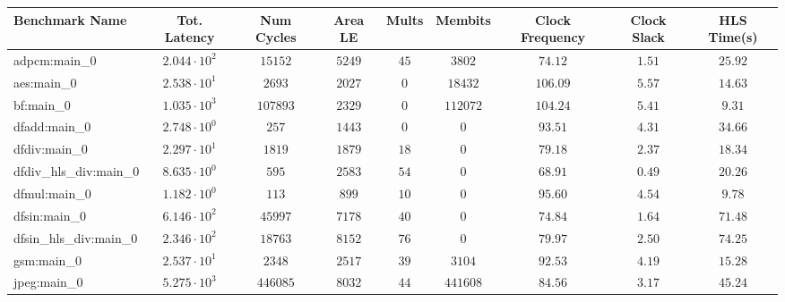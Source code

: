 \begin{tabular}{|l|c|c|c|c|c|c|c|c|}
\hline
Benchmark Name          & Tot. Latency           & Num Cycles & Area LE   & Mults   & Membits    & Clock Frequency & Clock Slack & HLS Time(s) \\
\hline
adpcm:main\_0           & $ 2.044 \cdot 10^{2} $ & $ 15152  $ & $ 5249  $ & $ 45  $ & $ 3802   $ & $ 74.12       $ & $ 1.51    $ & $ 25.92   $ \\
aes:main\_0             & $ 2.538 \cdot 10^{1} $ & $ 2693   $ & $ 2027  $ & $ 0   $ & $ 18432  $ & $ 106.09      $ & $ 5.57    $ & $ 14.63   $ \\
bf:main\_0              & $ 1.035 \cdot 10^{3} $ & $ 107893 $ & $ 2329  $ & $ 0   $ & $ 112072 $ & $ 104.24      $ & $ 5.41    $ & $ 9.31    $ \\
dfadd:main\_0           & $ 2.748 \cdot 10^{0} $ & $ 257    $ & $ 1443  $ & $ 0   $ & $ 0      $ & $ 93.51       $ & $ 4.31    $ & $ 34.66   $ \\
dfdiv:main\_0           & $ 2.297 \cdot 10^{1} $ & $ 1819   $ & $ 1879  $ & $ 18  $ & $ 0      $ & $ 79.18       $ & $ 2.37    $ & $ 18.34   $ \\
dfdiv\_hls\_div:main\_0 & $ 8.635 \cdot 10^{0} $ & $ 595    $ & $ 2583  $ & $ 54  $ & $ 0      $ & $ 68.91       $ & $ 0.49    $ & $ 20.26   $ \\
dfmul:main\_0           & $ 1.182 \cdot 10^{0} $ & $ 113    $ & $ 899   $ & $ 10  $ & $ 0      $ & $ 95.60       $ & $ 4.54    $ & $ 9.78    $ \\
dfsin:main\_0           & $ 6.146 \cdot 10^{2} $ & $ 45997  $ & $ 7178  $ & $ 40  $ & $ 0      $ & $ 74.84       $ & $ 1.64    $ & $ 71.48   $ \\
dfsin\_hls\_div:main\_0 & $ 2.346 \cdot 10^{2} $ & $ 18763  $ & $ 8152  $ & $ 76  $ & $ 0      $ & $ 79.97       $ & $ 2.50    $ & $ 74.25   $ \\
gsm:main\_0             & $ 2.537 \cdot 10^{1} $ & $ 2348   $ & $ 2517  $ & $ 39  $ & $ 3104   $ & $ 92.53       $ & $ 4.19    $ & $ 15.28   $ \\
jpeg:main\_0            & $ 5.275 \cdot 10^{3} $ & $ 446085 $ & $ 8032  $ & $ 44  $ & $ 441608 $ & $ 84.56       $ & $ 3.17    $ & $ 45.24   $ \\

\end{tabular}
